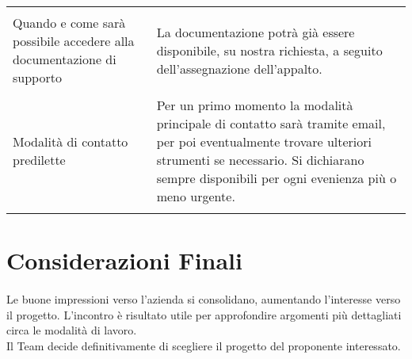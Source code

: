 \begin{longtable}{|p{7cm}|p{8cm}|}
    & \\

    Quando e come sarà possibile
    accedere alla documentazione
    di supporto     
    &
    La documentazione potrà già
    essere disponibile, su nostra
    richiesta, a seguito
    dell'assegnazione dell'appalto.\\

    & \\

    Modalità di contatto predilette    
    &
    Per un primo momento la
    modalità principale di contatto
    sarà tramite email, per poi
    eventualmente trovare
    ulteriori strumenti se
    necessario. Si dichiarano
    sempre disponibili per ogni
    evenienza più o meno urgente.\\

    & \\
    \hline
\end{longtable}

\section{Considerazioni Finali}

\paragraph{}
Le buone impressioni verso l'azienda si consolidano, aumentando l'interesse verso
il progetto.
L'incontro è risultato utile per approfondire argomenti più dettagliati circa le
modalità di lavoro.\\
Il Team decide definitivamente di scegliere il progetto del proponente interessato.